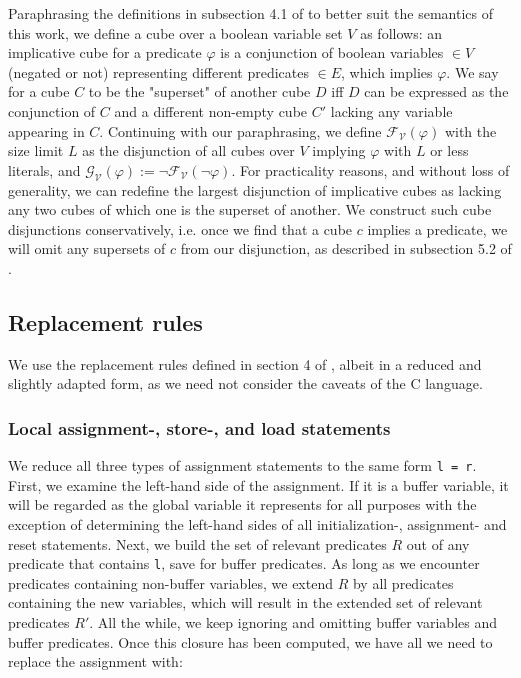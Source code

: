 Paraphrasing the definitions in subsection 4.1 of \cite{balletal01} to better suit the semantics of this work, we define a cube over a boolean variable set $V$ as follows: an implicative cube for a predicate $\varphi$ is a conjunction of boolean variables $\in V$ (negated or not) representing different predicates $\in E$, which implies $\varphi$. We say for a cube $C$ to be the "superset" of another cube $D$ iff $D$ can be expressed as the conjunction of $C$ and a different non-empty cube $C'$ lacking any variable appearing in $C$. Continuing with our paraphrasing, we define $\mathcal{F_V}(\varphi)$ with the size limit $L$ as the disjunction of all cubes over $V$ implying $\varphi$ with $L$ or less literals, and $\mathcal{G_V}(\varphi) := \neg\mathcal{F_V}(\neg\varphi)$. For practicality reasons, and without loss of generality, we can redefine the largest disjunction of implicative cubes as lacking any two cubes of which one is the superset of another. We construct such cube disjunctions conservatively, i.e. once we find that a cube $c$ implies a predicate, we will omit any supersets of $c$ from our disjunction, as described in subsection 5.2 of \cite{balletal01}.

\subsection{Replacement rules}

We use the replacement rules defined in section 4 of \cite{balletal01}, albeit in a reduced and slightly adapted form, as we need not consider the caveats of the C language.

\subsubsection{Local assignment-, store-, and load statements}

We reduce all three types of assignment statements to the same form \lstinline$l = r$. First, we examine the left-hand side of the assignment. If it is a buffer variable, it will be regarded as the global variable it represents for all purposes with the exception of determining the left-hand sides of all initialization-, assignment- and reset statements. Next, we build the set of relevant predicates $R$ out of any predicate that contains \lstinline$l$, save for buffer predicates. As long as we encounter predicates containing non-buffer variables, we extend $R$ by all predicates containing the new variables, which will result in the extended set of relevant predicates $R'$. All the while, we keep ignoring and omitting buffer variables and buffer predicates. Once this closure has been computed, we have all we need to replace the assignment with:

